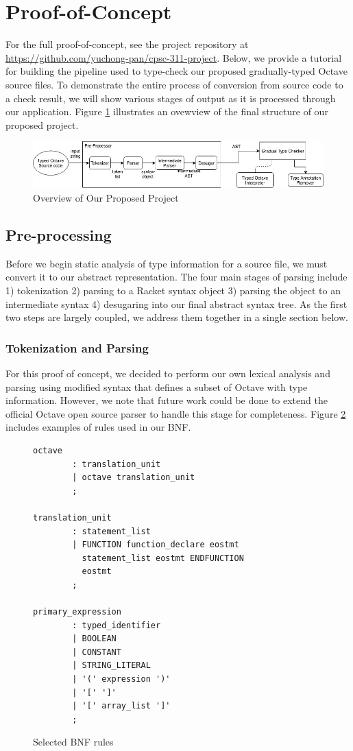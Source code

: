 \section{Proof-of-Concept}
For the full proof-of-concept, see the project repository at \url{https://github.com/yuchong-pan/cpsc-311-project}. Below, we provide a tutorial for building the pipeline used to type-check our proposed gradually-typed Octave source files. To demonstrate the entire process of conversion from source code to a check result, we will show various stages of output as it is processed through our application. Figure \ref{fig:overview} illustrates an ovewview of the final structure of our proposed project.

\begin{figure}[h]
    \centering
    \includegraphics[width=.5\textwidth]{overview.jpg}
    \caption{Overview of Our Proposed Project}
    \label{fig:overview}
\end{figure}

\subsection{Pre-processing}
Before we begin static analysis of type information for a source file, we must convert it to our abstract representation. The four main stages of parsing include 1) tokenization 2) parsing to a Racket syntax object 3) parsing the object to an intermediate syntax 4) desugaring into our final abstract syntax tree. As the first two steps are largely coupled, we address them together in a single section below.

\subsubsection{Tokenization and Parsing}
For this proof of concept, we decided to perform our own lexical analysis and parsing using modified syntax that defines a subset of Octave with type information. However, we note that future work could be done to extend the official Octave open source parser \cite{johneaton2018octaveparser} to handle this stage for completeness. Figure \ref{fig:bnf} includes examples of rules used in our BNF.

\begin{figure}[h]
    \begin{lstlisting}
octave
        : translation_unit
        | octave translation_unit
        ;

translation_unit
        : statement_list
        | FUNCTION function_declare eostmt
          statement_list eostmt ENDFUNCTION
          eostmt
        ;

primary_expression
        : typed_identifier
        | BOOLEAN
        | CONSTANT
        | STRING_LITERAL
        | '(' expression ')'
        | '[' ']'
        | '[' array_list ']'
        ;
    \end{lstlisting}
    \caption[]{Selected BNF rules}
    \label{fig:bnf}
\end{figure}

